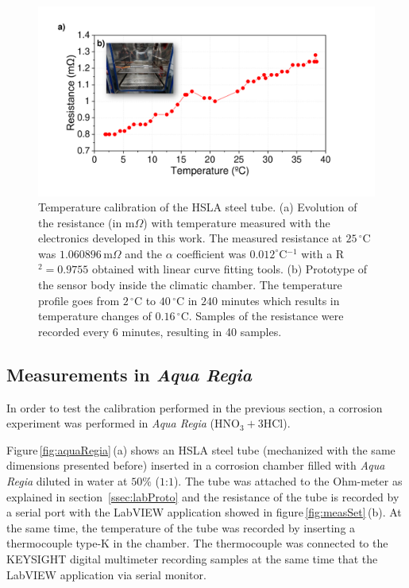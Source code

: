 \documentclass[journal,twoside,web]{ieeecolor}
\begin{document}
\begin{figure}[!t]
\includegraphics [trim = 20mm 20mm 35mm 12mm, clip, width=1\columnwidth]{images/fig7_v4.pdf}
\caption{Temperature calibration of the HSLA steel tube. (a) Evolution of the resistance (in m$\Omega$) with temperature measured with the electronics developed in this work. The measured resistance at $25$\,$^{\circ}$C was $1.060896$\,m$\Omega$ and the $\alpha$ coefficient was $0.012 ^{\circ}$C$^{-1}$ with a R$^{2}=0.9755$ obtained with linear curve fitting tools. (b) Prototype of the sensor body inside the climatic chamber. The temperature profile goes from $2$\,$^{\circ}$C to $40$\,$^{\circ}$C in $240$ minutes which results in temperature changes of $0.16$\,$^{\circ}$C. Samples of the resistance were recorded every 6 minutes, resulting in 40 samples.}
\label{fig:tempCal}
\end{figure}
\subsection{Measurements in \textit{Aqua Regia}}
\label{ssec:measAquaRegia}
In order to test the calibration performed in the previous section, a corrosion experiment was performed in \textit{Aqua Regia} (HNO$_{3}+3$HCl).

Figure\,\ref{fig:aquaRegia}\,(a) shows an HSLA steel tube (mechanized with the same dimensions presented before)  inserted in a corrosion chamber filled with \textit{Aqua Regia} diluted in water at $50\%$ ($1$:$1$). The tube was attached to the Ohm-meter as explained in section~\ref{ssec:labProto} and the resistance of the tube is recorded by a serial port with the LabVIEW application showed in figure\,\ref{fig:measSet}\,(b). At the same time, the temperature of the tube was recorded by inserting a thermocouple type-K in the chamber. The thermocouple was connected to the KEYSIGHT digital multimeter recording samples at the same time that the LabVIEW application via serial monitor.
\end{document}
